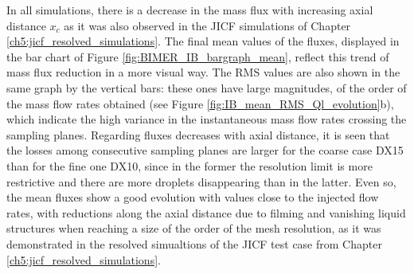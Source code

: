 In all simulations, there is a decrease in the mass flux with increasing axial distance $x_c$ as it was also observed in the JICF simulations of Chapter \ref{ch5:jicf_resolved_simulations}. The final mean values of the fluxes, displayed in the bar chart of Figure \ref{fig:BIMER_IB_bargraph_mean}, reflect this trend of mass flux reduction in a more visual way. The RMS values are also shown in the same graph by the vertical bars: these ones have large magnitudes, of the order of the mass flow rates obtained (see Figure \ref{fig:IB_mean_RMS_Ql_evolution}b), which indicate the high variance in the instantaneous mass flow rates crossing the sampling planes. Regarding fluxes decreases with axial distance, it is seen that the losses among consecutive sampling planes are larger for the coarse case DX15 than for the fine one DX10, since in the former the resolution limit is more restrictive and there are more droplets disappearing than in the latter. Even so, the mean fluxes show a good evolution with values close to the injected flow rates, with reductions along the axial distance due to filming and vanishing liquid structures when reaching a size of the order of the mesh resolution, as it was demonstrated in the resolved simualtions of the JICF test case from Chapter \ref{ch5:jicf_resolved_simulations}.


